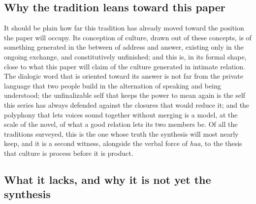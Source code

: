 \subsection*{Why the tradition leans toward this paper}

It should be plain how far this tradition has already moved toward the position the paper will occupy. Its conception of culture, drawn out of these concepts, is of something generated in the between of address and answer, existing only in the ongoing exchange, and constitutively unfinished; and this is, in its formal shape, close to what this paper will claim of the culture generated in intimate relation. The dialogic word that is oriented toward its answer is not far from the private language that two people build in the alternation of speaking and being understood; the unfinalizable self that keeps the power to mean again is the self this series has always defended against the closures that would reduce it; and the polyphony that lets voices sound together without merging is a model, at the scale of the novel, of what a good relation lets its two members be. Of all the traditions surveyed, this is the one whose truth the synthesis will most nearly keep, and it is a second witness, alongside the verbal force of \emph{hua}, to the thesis that culture is process before it is product.

\subsection*{What it lacks, and why it is not yet the synthesis}

